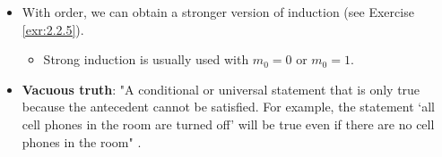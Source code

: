 \documentclass[../main.tex]{subfiles}
\begin{document}
\begin{itemize}
\begin{prop}
        \begin{proof}
            See Exercise \ref{exr:2.2.4} to fill in the gaps.\par
            First, show that no two (or three) of the statements can hold simultaneously. If $a<b$ or $a>b$, then $a\neq b$ by definition. Also, if $a>b$ and $a<b$, then $a=b$, a contradiction.\par
            Second, show that at least one of the statements is always true. We induct on $a$ (keeping $b$ fixed). When $a=0$, we have $0\leq b$ for all $b$ (see Exercise \ref{exr:2.2.4a}), so we either have $0=b$ or $0<b$, which proves the base case. Now suppose inductively that we have proven the proposition for $a$. From the trichotomy of $a$, there are three cases: $a<b$, $a=b$, and $a>b$. If $a>b$, then $a\pplus>b$ (see Exercise \ref{exr:2.2.4b}). If $a=b$, then $a\pplus>b$ (see Exercise \ref{exr:2.2.4c}). If $a<b$, then $a\pplus\leq b$ by Proposition \ref{prp:ordering}. Thus, either $a\pplus=b$ or $a\pplus<b$. This closes the induction.
        \end{proof}
    \end{prop}
    \item {}With order, we can obtain a stronger version of induction (see Exercise \ref{exr:2.2.5}).
    \begin{itemize}
        \item Strong induction is usually used with $m_0=0$ or $m_0=1$.
    \end{itemize}
    \item \textbf{Vacuous truth}: "A conditional or universal statement that is only true because the antecedent cannot be satisfied. For example, the statement `all cell phones in the room are turned off' will be true even if there are no cell phones in the room" \cite{bib:vacuous}.
\end{itemize}
\end{document}
